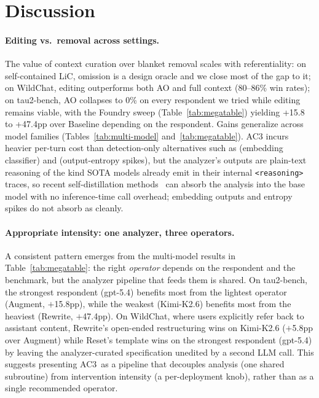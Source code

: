 \documentclass{article}
\newcommand{\method}{AC3\xspace}
\begin{document}
\section{Discussion}
\label{sec:discussion}

\paragraph{Editing vs.\ removal across settings.}
The value of context curation over blanket removal scales with referentiality: on self-contained LiC, omission is a design oracle and we close most of the gap to it; on WildChat, editing outperforms both AO and full context (80--86\% win rates); on tau2-bench, AO collapses to 0\% on every respondent we tried while editing remains viable, with the Foundry sweep (Table~\ref{tab:megatable}) yielding +15.8 to +47.4pp over Baseline depending on the respondent. Gains generalize across model families (Tables~\ref{tab:multi-model} and~\ref{tab:megatable}). \method incurs heavier per-turn cost than detection-only alternatives such as \citet{huang2026context} (embedding classifier) and \citet{khalid2025ergo} (output-entropy spikes), but the analyzer's outputs are plain-text reasoning of the kind SOTA models already emit in their internal \texttt{<reasoning>} traces, so recent self-distillation methods~\citep{zhao2026selfdistillreason,hubotter2026rlselfdistill,shenfeld2026selfdistill} can absorb the analysis into the base model with no inference-time call overhead; embedding outputs and entropy spikes do not absorb as cleanly.

\paragraph{Appropriate intensity: one analyzer, three operators.}
A consistent pattern emerges from the multi-model results in Table~\ref{tab:megatable}: the right \emph{operator} depends on the respondent and the benchmark, but the analyzer pipeline that feeds them is shared. On tau2-bench, the strongest respondent (gpt-5.4) benefits most from the lightest operator (Augment, $+$15.8pp), while the weakest (Kimi-K2.6) benefits most from the heaviest (Rewrite, $+$47.4pp). On WildChat, where users explicitly refer back to assistant content, Rewrite's open-ended restructuring wins on Kimi-K2.6 ($+$5.8pp over Augment) while Reset's template wins on the strongest respondent (gpt-5.4) by leaving the analyzer-curated specification unedited by a second LLM call. This suggests presenting \method~as a pipeline that decouples analysis (one shared subroutine) from intervention intensity (a per-deployment knob), rather than as a single recommended operator.
\end{document}

